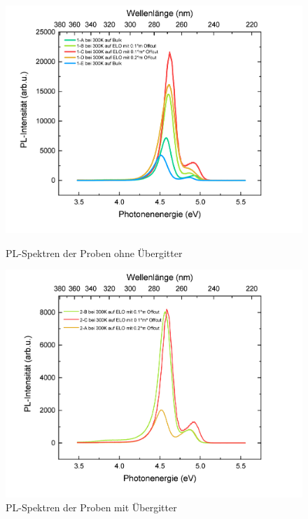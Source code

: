 \begin{figure}[htb]
    \centering
    \begin{minipage}[t]{0.49\linewidth}
        \centering
        \includegraphics[width=\linewidth]{Bilder/TS4045Uebersicht.pdf}
        \caption{PL-Spektren der Proben ohne Übergitter}
    \end{minipage}%
    \hfill
    \begin{minipage}[t]{0.49\linewidth}
        \centering
        \includegraphics[width=\linewidth]{Bilder/TS4048Uebersicht.pdf}
        \caption{PL-Spektren der Proben mit Übergitter}
    \end{minipage}
\end{figure}






